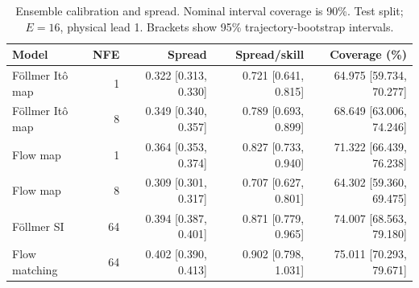 \begin{table}[t]
\centering
\small
\setlength{\tabcolsep}{3pt}
\caption{Ensemble calibration and spread. Nominal interval coverage is 90\%. Test split; $E=16$, physical lead 1. Brackets show 95\% trajectory-bootstrap intervals.}
\label{tab:map-calibration}
\begin{tabular}{lrrrr}
\toprule
Model & NFE & Spread & Spread/skill & Coverage (\%) \\
\midrule
Föllmer Itô map & 1 & 0.322 [0.313, 0.330] & 0.721 [0.641, 0.815] & 64.975 [59.734, 70.277] \\
Föllmer Itô map & 8 & 0.349 [0.340, 0.357] & 0.789 [0.693, 0.899] & 68.649 [63.006, 74.246] \\
\addlinespace
Flow map & 1 & 0.364 [0.353, 0.374] & 0.827 [0.733, 0.940] & 71.322 [66.439, 76.238] \\
Flow map & 8 & 0.309 [0.301, 0.317] & 0.707 [0.627, 0.801] & 64.302 [59.360, 69.475] \\
\addlinespace
Föllmer SI & 64 & 0.394 [0.387, 0.401] & 0.871 [0.779, 0.965] & 74.007 [68.563, 79.180] \\
\addlinespace
Flow matching & 64 & 0.402 [0.390, 0.413] & 0.902 [0.798, 1.031] & 75.011 [70.293, 79.671] \\
\bottomrule
\end{tabular}
\end{table}
